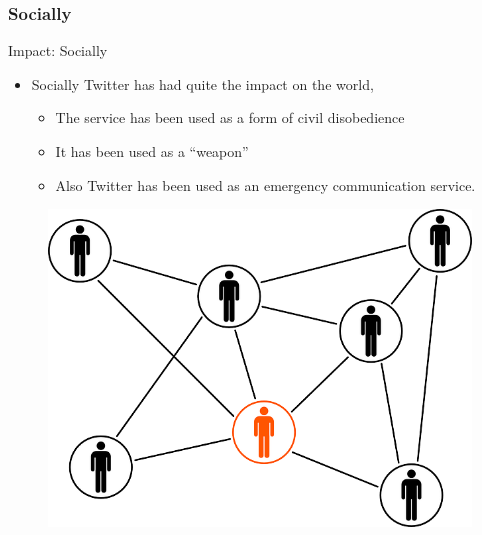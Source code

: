 \documentclass[xcolor=svgnames,handout]{beamer}
\begin{document}
\subsubsection{Socially}
\begin{frame}
{Impact: Socially}
	\begin{itemize}
		\item Socially Twitter has had quite the impact on the world,
			\begin{itemize}
			\item The service has been used as a form of civil disobedience~\cite{haroonsiddique2010}~\cite{adamgabbattmatthewtaylor2011}
			\item It has been used as a ``weapon''~\cite{ricardobuettnerkatharinabuettner2016}
			\item Also Twitter has been used as an emergency communication service.~\cite{alexandermillsruichenjinkyuleehraghavrao2009}~\cite{chelseajcartergregbotelho2013}~\cite{brookejarvis2013}~\cite{robertpowerbellarobinsondavidratcliffe2013}~\cite{paulsearledanielcbowdenmichelleguy2013}
			\end{itemize}
	\end{itemize}
	\begin{figure}[h]
		\centering
		\includegraphics[scale=0.15]{social-vector.png}
		\caption{\cite{openclipartvectorsUnkown}}
	\end{figure}

\end{frame}
\end{document}
